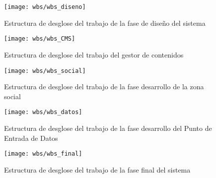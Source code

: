 \begin{figure}[h]
	\centering
	\texttt{[image: wbs/wbs\_diseno]}
	\caption{Estructura de desglose del trabajo de la fase de diseño del sistema}
	\label{fig:wbs_diseno}
\end{figure}

\begin{figure}[h]
	\centering
	\texttt{[image: wbs/wbs\_CMS]}
	\caption{Estructura de desglose del trabajo del gestor de contenidos}
	\label{fig:wbs_CMS}
\end{figure}

\begin{figure}[h]
	\centering
	\texttt{[image: wbs/wbs\_social]}
	\caption{Estructura de desglose del trabajo de la fase desarrollo de la zona social}
	\label{fig:wbs_social}
\end{figure}

\begin{figure}[h]
	\centering
	\texttt{[image: wbs/wbs\_datos]}
	\caption{Estructura de desglose del trabajo de la fase desarrollo del Punto de Entrada de Datos}
	\label{fig:wbs_datos}
\end{figure}

\begin{figure}[h]
	\centering
	\texttt{[image: wbs/wbs\_final]}
	\caption{Estructura de desglose del trabajo de la fase final del sistema}
	\label{fig:wbs_final}
\end{figure}